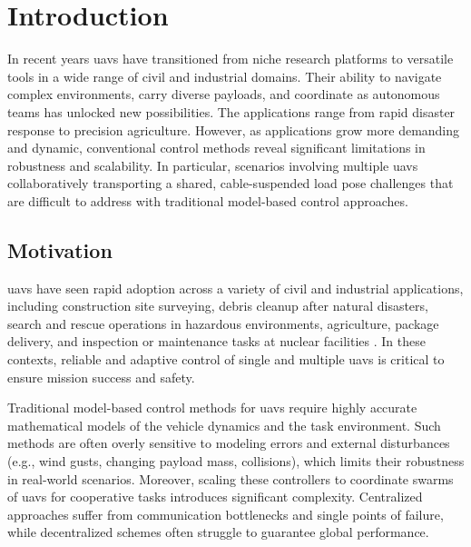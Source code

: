 \chapter{Introduction}
In recent years \glspl{uav} have transitioned from niche research platforms to versatile tools in a wide range of civil and industrial domains. Their ability to navigate complex environments, carry diverse payloads, and coordinate as autonomous teams has unlocked new possibilities. The applications range from rapid disaster response to precision agriculture. However, as applications grow more demanding and dynamic, conventional control methods reveal significant limitations in robustness and scalability. In particular, scenarios involving multiple \glspl{uav} collaboratively transporting a shared, cable-suspended load pose challenges that are difficult to address with traditional model-based control approaches.

\section{Motivation}
\glspl{uav} have seen rapid adoption across a variety of civil and industrial applications, including construction site surveying, debris cleanup after natural disasters, search and rescue operations in hazardous environments, agriculture, package delivery, and inspection or maintenance tasks at nuclear facilities \autocite{Idrissi2022AROA,Lyu2023UnmannedAVA,Chen2021FromUSA,Abbaraju2018SensingASA}. In these contexts, reliable and adaptive control of single and multiple \glspl{uav} is critical to ensure mission success and safety.

Traditional model-based control methods for \glspl{uav} require highly accurate mathematical models of the vehicle dynamics and the task environment. Such methods are often overly sensitive to modeling errors and external disturbances (e.g., wind gusts, changing payload mass, collisions), which limits their robustness in real-world scenarios. Moreover, scaling these controllers to coordinate swarms of \glspl{uav} for cooperative tasks introduces significant complexity. Centralized approaches suffer from communication bottlenecks and single points of failure, while decentralized schemes often struggle to guarantee global performance.

